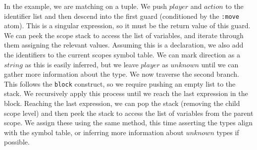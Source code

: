 In the example, we are matching on a tuple. We push $player$ and $action$ to the identifier list and then descend into the first guard (conditioned by the \texttt{:move} atom). This is a singular expression, so it must be the return value of this guard. We can peek the scope stack to access the list of variables, and iterate through them assigning the relevant values. Assuming this is a declaration, we also add the identifiers to the current scopes symbol table. We can mark direction as a $string$ as this is easily inferred, but we leave $player$ as $unknown$ until we can gather more information about the type. We now traverse the second branch. This follows the \texttt{block} construct, so we require pushing an empty list to the stack. We recursively apply this process until we reach the last expression in the block. Reaching the last expression, we can pop the stack (removing the child scope level) and then peek the stack to access the list of variables from the parent scope. We assign these using the same method, this time asserting the types align with the symbol table, or inferring more information about $unknown$ types if possible.
\par
